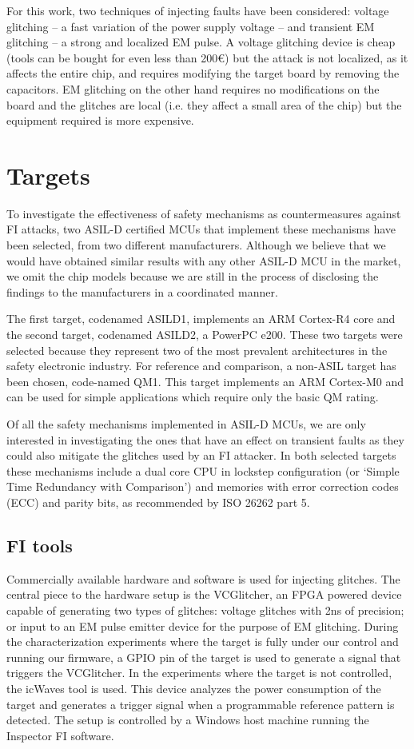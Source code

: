 \documentclass[10pt, conference, compsocconf]{IEEEtran}
\newcommand{\TI}{ASILD1\xspace}
\newcommand{\ST}{ASILD2\xspace}
\newcommand{\NXP}{QM1\xspace}
\begin{document}
For this work, two techniques of injecting faults have been considered: voltage glitching -- a fast variation of the power supply voltage -- and transient EM glitching -- a strong and localized EM pulse. A voltage glitching device is cheap (tools can be bought for even less than 200€) but the attack is not localized, as it affects the entire chip, and requires modifying the target board by removing the capacitors. EM glitching on the other hand requires no modifications on the board and the glitches are local (i.e. they affect a small area of the chip) but the equipment required is more expensive. 


\section{Targets}
To investigate the effectiveness of safety mechanisms as countermeasures against FI attacks, two ASIL-D certified MCUs that implement these mechanisms have been selected, from two different
manufacturers. 
Although we believe that we would have obtained similar results with any other ASIL-D MCU in the market, we omit the chip models because we are still in the process of disclosing the findings to the manufacturers in a coordinated manner.

The first target, codenamed \TI, implements an ARM Cortex-R4 core and the second target, codenamed \ST, a PowerPC e200. These two targets were selected because they represent two of the most prevalent architectures in the safety electronic industry. For reference and comparison, a non-ASIL target has been chosen, code-named \NXP. This target implements an ARM Cortex-M0 and can be used for simple applications which require only the basic QM rating.

Of all the safety mechanisms implemented in ASIL-D MCUs, we are only interested in investigating the ones that have an effect on transient faults as they could also mitigate the glitches used by an FI attacker. In both selected targets these mechanisms include a dual core CPU in lockstep configuration (or `Simple Time Redundancy with Comparison') and memories with error correction codes (ECC) and parity bits, as recommended by ISO 26262 part 5. 

\subsection{FI tools}
Commercially available hardware 
and software 
is used for injecting glitches.
The central piece to the hardware setup is the VCGlitcher, an FPGA powered device capable of generating two types of glitches: voltage glitches with 2ns of precision; or input to an EM pulse emitter device for the purpose of EM glitching. During the characterization experiments where the target is fully under our control and running our firmware, a GPIO pin of the target is used to generate a signal that triggers the VCGlitcher. In the experiments where the target is not controlled, the icWaves tool is used. This device analyzes the power consumption of the target and generates a trigger signal when a programmable reference pattern is detected. The setup is controlled by a Windows host machine running the Inspector FI software.
\end{document}
